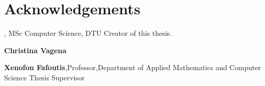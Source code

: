 \section*{Acknowledgements}

\textbf{\thesisauthor}, MSc Computer Science, DTU \newline
Creator of this thesis.

\textbf{Christina Vagena}

\textbf{Xenofon Fafoutis},Professor,Department of Applied Mathematics  and Computer Science \newline
Thesis Supervisor

